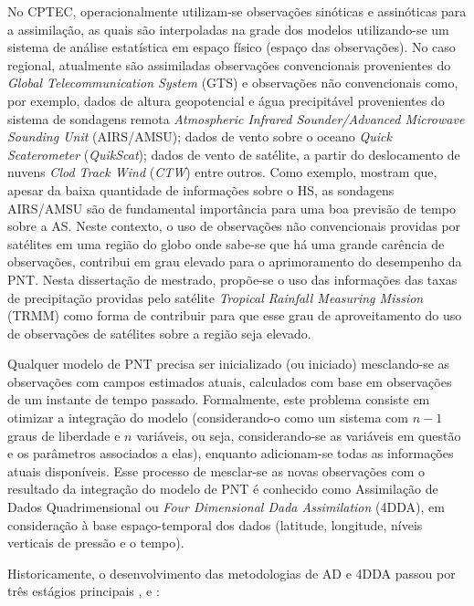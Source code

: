 No CPTEC, operacionalmente utilizam-se observações sinóticas e assinóticas para a assimilação, as quais são interpoladas na grade dos modelos utilizando-se um sistema de análise estatística em espaço físico (espaço das observações). No caso regional, atualmente são assimiladas observações convencionais provenientes do \textit{Global Telecommunication System} (GTS) e observações não convencionais como, por exemplo, dados de altura geopotencial e água precipitável provenientes do sistema de sondagens remota \textit{Atmospheric Infrared Sounder/Advanced Microwave Sounding Unit} (AIRS/AMSU); dados de vento sobre o oceano \textit{Quick Scaterometer} (\textit{QuikScat}); dados de vento de satélite, a partir do deslocamento de nuvens \textit{Clod Track Wind} (\textit{CTW}) entre outros. Como exemplo,  mostram que, apesar da baixa quantidade de informações sobre o HS, as sondagens AIRS/AMSU são de fundamental importância para uma boa previsão de tempo sobre a AS. Neste contexto, o uso de observações não convencionais providas por satélites em uma região do globo onde sabe-se que há uma grande carência de observações, contribui em grau elevado para o aprimoramento do desempenho da PNT. Nesta dissertação de mestrado, propõe-se o uso das informações das taxas de precipitação providas pelo satélite \textit{Tropical Rainfall Measuring Mission} (TRMM) como forma de contribuir para que esse grau de aproveitamento do uso de observações de satélites sobre a região seja elevado.

Qualquer modelo de PNT precisa ser inicializado (ou iniciado) mesclando-se as observações com campos estimados atuais, calculados com base em observações de um instante de tempo passado. Formalmente, este problema consiste em otimizar a integração do modelo (considerando-o como um sistema com $n-1$ graus de liberdade e $n$ variáveis, ou seja, considerando-se as variáveis em questão e os parâmetros associados a elas), enquanto adicionam-se todas as informações atuais disponíveis. Esse processo de mesclar-se as novas observações com o resultado da integração do modelo de PNT é conhecido como Assimilação de Dados Quadrimensional ou \textit{Four Dimensional Dada Assimilation} (4DDA), em consideração à base espaço-temporal dos dados (latitude, longitude, níveis verticais de pressão e o tempo).

Historicamente, o desenvolvimento das metodologias de AD e 4DDA passou por três estágios principais \cite{wangetal00}, e \cite{kalnay03}:

